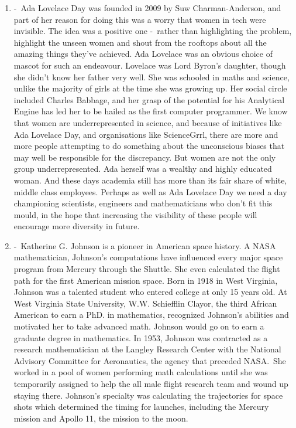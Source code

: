 \documentclass[12pt,a4paper]{article}
\begin{document}
\begin{enumerate}
    \item {} -\ Ada Lovelace Day was founded in 2009 by Suw Charman-Anderson, and part of her reason for doing this was a worry that women in tech were invisible. The idea was a positive one -\ rather than highlighting the problem, highlight the unseen women and shout from the rooftops about all the amazing things they’ve achieved. Ada Lovelace was an obvious choice of mascot for such an endeavour. Lovelace was Lord Byron’s daughter, though she didn’t know her father very well. She was schooled in maths and science, unlike the majority of girls at the time she was growing up. Her social circle included Charles Babbage, and her grasp of the potential for his Analytical Engine has led her to be hailed as the first computer programmer. We know that women are underrepresented in science, and because of initiatives like Ada Lovelace Day, and organisations like ScienceGrrl, there are more and more people attempting to do something about the unconscious biases that may well be responsible for the discrepancy. But women are not the only group underrepresented. Ada herself was a wealthy and highly educated woman. And these days academia still has more than its fair share of white, middle class employees. Perhaps as well as Ada Lovelace Day we need a day championing scientists, engineers and mathematicians who don’t fit this mould, in the hope that increasing the visibility of these people will encourage more diversity in future. \href{https://www.theguardian.com/science/sifting-the-evidence/2015/oct/13/why-ada-lovelace-day-matters}{}
    \item {} -\ Katherine G. Johnson is a pioneer in American space history. A NASA mathematician, Johnson's computations have influenced every major space program from Mercury through the Shuttle. She even calculated the flight path for the first American mission space. Born in 1918 in West Virginia, Johnson was a talented student who entered college at only 15 years old. At West Virginia State University, W.W. Schiefflin Clayor, the third African American to earn a PhD. in mathematics, recognized Johnson's abilities and motivated her to take advanced math. Johnson would go on to earn a graduate degree in mathematics. In 1953, Johnson was contracted as a research mathematician at the Langley Research Center with the National Advisory Committee for Aeronautics, the agency that preceded NASA.\ She worked in a pool of women performing math calculations until she was temporarily assigned to help the all male flight research team and wound up staying there. Johnson's specialty was calculating the trajectories for space shots which determined the timing for launches, including the Mercury mission and Apollo 11, the mission to the moon.

\end{enumerate}
\end{document}

